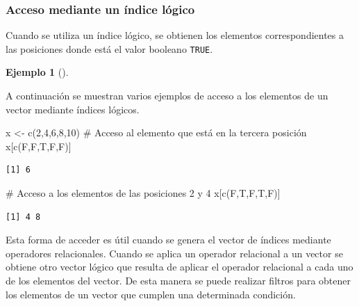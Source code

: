 \documentclass[
  a4paper,
]{scrreport}
\newenvironment{Shaded}{\begin{snugshade}}{\end{snugshade}}
\newcommand{\CommentTok}[1]{\textcolor[rgb]{0.37,0.37,0.37}{#1}}
\newcommand{\DecValTok}[1]{\textcolor[rgb]{0.68,0.00,0.00}{#1}}
\newcommand{\FunctionTok}[1]{\textcolor[rgb]{0.28,0.35,0.67}{#1}}
\newcommand{\NormalTok}[1]{\textcolor[rgb]{0.00,0.23,0.31}{#1}}
\newcommand{\OtherTok}[1]{\textcolor[rgb]{0.00,0.23,0.31}{#1}}
\theoremstyle{definition}
\theoremstyle{definition}
\newtheorem{example}{Ejemplo}[chapter]
\theoremstyle{remark}
\begin{document}
\hypertarget{acceso-mediante-un-uxedndice-luxf3gico}{%
\subsubsection{Acceso mediante un índice
lógico}\label{acceso-mediante-un-uxedndice-luxf3gico}}

Cuando se utiliza un índice lógico, se obtienen los elementos
correspondientes a las posiciones donde está el valor booleano
\texttt{TRUE}.

\leavevmode{}%
\begin{example}[]\label{exm-acceso-vector-indice-logico}

A continuación se muestran varios ejemplos de acceso a los elementos de
un vector mediante índices lógicos.

\begin{Shaded}
\begin{Highlighting}[]
\NormalTok{x }\OtherTok{\textless{}{-}} \FunctionTok{c}\NormalTok{(}\DecValTok{2}\NormalTok{,}\DecValTok{4}\NormalTok{,}\DecValTok{6}\NormalTok{,}\DecValTok{8}\NormalTok{,}\DecValTok{10}\NormalTok{)}
\CommentTok{\# Acceso al elemento que está en la tercera posición}
\NormalTok{x[}\FunctionTok{c}\NormalTok{(F,F,T,F,F)]}
\end{Highlighting}
\end{Shaded}

\begin{verbatim}
[1] 6
\end{verbatim}

\begin{Shaded}
\begin{Highlighting}[]
\CommentTok{\# Acceso a los elementos de las posiciones 2 y 4}
\NormalTok{x[}\FunctionTok{c}\NormalTok{(F,T,F,T,F)]}
\end{Highlighting}
\end{Shaded}

\begin{verbatim}
[1] 4 8
\end{verbatim}

\end{example}

Esta forma de acceder es útil cuando se genera el vector de índices
mediante operadores relacionales. Cuando se aplica un operador
relacional a un vector se obtiene otro vector lógico que resulta de
aplicar el operador relacional a cada uno de los elementos del vector.
De esta manera se puede realizar filtros para obtener los elementos de
un vector que cumplen una determinada condición.
\end{document}

